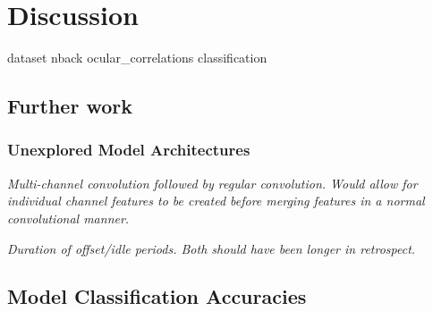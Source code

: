 \chapter{Discussion}

{dataset}
{nback}
{ocular_correlations}
{classification}


\section{Further work}

\subsection{Unexplored Model Architectures}

\textit{Multi-channel convolution followed by regular convolution. Would allow for individual channel features to be created before merging features in a normal convolutional manner.}




\textit{Duration of offset/idle periods. Both should have been longer in retrospect.}




\section{Model Classification Accuracies}




